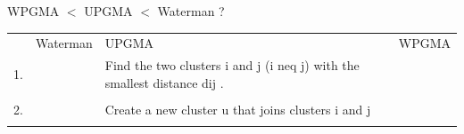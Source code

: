 WPGMA $<$ UPGMA $<$ Waterman ?

\begin{table}[H]
    \centering
    \begin{tabular}{c p{5cm}p{5cm}p{5cm}}
    & Waterman & UPGMA & WPGMA \\
        1. & & Find the two clusters i and j (i neq j) with the smallest distance dij . \\ \\
        2.  & & Create a new cluster u that joins clusters i and j \\ \\
    \end{tabular}
\end{table}

